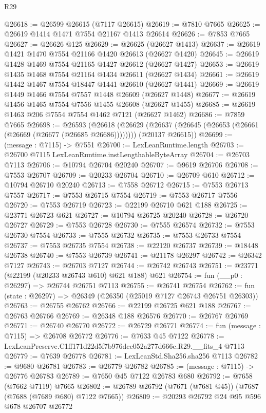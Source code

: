 \begin{lexlean}{R29}
\begin{coremodule}
@26618 := @26599 @26615 (@7117 @26615)
@26619 := @7810 @7665
@26625 := @26619 @1414 @1471 @7554 @21167 @1413 @26614
@26626 := @7853 @7665
@26627 := @26626 @125
@26629 := @26625 (@26627 @1413)
@26637 := @26619 @1421 @1470 @7554 @21166 @1420 @26613 (@26627 @1420)
@26645 := @26619 @1428 @1469 @7554 @21165 @1427 @26612 (@26627 @1427)
@26653 := @26619 @1435 @1468 @7554 @21164 @1434 @26611 (@26627 @1434)
@26661 := @26619 @1442 @1467 @7554 @18447 @1441 @26610 (@26627 @1441)
@26669 := @26619 @1449 @1466 @7554 @7557 @1448 @26609 (@26627 @1448)
@26677 := @26619 @1456 @1465 @7554 @7556 @1455 @26608 (@26627 @1455)
@26685 := @26619 @1463 @206 @7554 @7554 @1462 @7121 (@26627 @1462)
@26686 := @7859 @7665
@26698 := @26593
    (@26618
      (@26629 (@26637 (@26645 (@26653 (@26661 (@26669 (@26677 (@26685 @26686))))))))
      (@20137 @26615))
@26699 := (message : @7115) -> @7551
@26700 := LexLeanRuntime.length
@26703 := @26700 @7115 LexLeanRuntime.instLengthableByteArray
@26704 := @26703 @7113
@26706 := @10794 @26704 @20240
@26707 := @9619 @26706
@26708 := @7553 @26707
@26709 := @20233 @26704
@26710 := @26709 @610
@26712 := @10794 @26710 @20240
@26713 := @7558 @26712
@26715 := @7553 @26713 @7557
@26717 := @7553 @26715 @7554
@26719 := @7553 @26717 @7556
@26720 := @7553 @26719
@26723 := @22199 @26710 @621 @188
@26725 := @23771 @26723 @621
@26727 := @10794 @26725 @20240
@26728 := @26720 @26727
@26729 := @7553 @26728
@26730 := @7555 @26574
@26732 := @7553 @26730 @7554
@26733 := @7555 @26732
@26735 := @7553 @26733 @7554
@26737 := @7553 @26735 @7554
@26738 := @22120 @26737
@26739 := @18448 @26738
@26740 := @7553 @26739
@26741 := @21178 @26297
@26742 := @26342 @7127
@26743 := @26703 @7127
@26744 := @26742 @26743
@26751 := @23771 (@22199 (@20233 @26743 @610) @621 @188) @621
@26754 := fun (__p0 : @26297) => @26744 @26751 @7113
@26755 := @26741 @26754
@26762 := fun (state : @26297) => @26349 (@26350 (@25019 @7127 @26743 @26751 @26303))
@26763 := @26755 @26762
@26766 := @22199 @26725 @621 @188
@26767 := @26763 @26766
@26769 := @26348 @188 @26576
@26770 := @26767 @26769
@26771 := @26740 @26770
@26772 := @26729 @26771
@26774 := fun (message : @7115) => @26708 @26772
@26776 := @7633 @45 @7122
@26778 := LexLeanPreserve.C1ff171d22d5f7b976dcc052a277d666e.R29.__fits_4 @7113
@26779 := @7639 @26778
@26781 := LexLeanStd.Sha256.sha256 @7113
@26782 := @9680 @26781
@26783 := @26779 @26782
@26785 := (message : @7115) -> @26776 @26783
@26789 := @7650 @45 @7122 @26783 @680
@26792 := @7658 (@7662 @7119) @7665
@26802 := @26789 @26792 (@7671 (@7681 @45)) (@7687 (@7688 (@7689 @680) @7122 @7665))
@26809 := @20293 @26792 @24 @95 @596 @678 @26707 @26772

\end{coremodule}
\end{lexlean}

